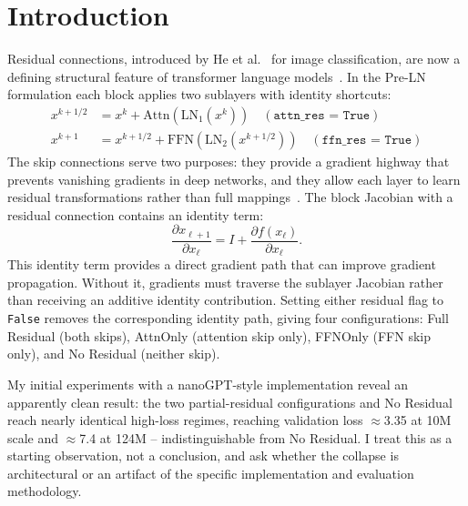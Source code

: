 \documentclass[11pt]{article}
\begin{document}
\section{Introduction}
Residual connections, introduced by He et al.~\cite{he2016deep} for image classification, are now a defining structural feature of transformer language models~\cite{vaswani2017attention,radford2019language}. In the Pre-LN formulation each block applies two sublayers with identity shortcuts:
\begin{align}
 x^{k+1/2} &= x^k + \mathrm{Attn}(\mathrm{LN}_1(x^k)) \quad (\texttt{attn\_res = True}) \label{eq:attn} \\
 x^{k+1}   &= x^{k+1/2} + \mathrm{FFN}(\mathrm{LN}_2(x^{k+1/2})) \quad (\texttt{ffn\_res = True}) \label{eq:ffn}
\end{align}
The skip connections serve two purposes: they provide a gradient highway that prevents vanishing gradients in deep networks, and they allow each layer to learn residual transformations rather than full mappings~\cite{he2016deep}. The block Jacobian with a residual connection contains an identity term:
\begin{equation}
\frac{\partial x_{\ell+1}}{\partial x_\ell} = I + \frac{\partial f(x_\ell)}{\partial x_\ell}.
\end{equation}
This identity term provides a direct gradient path that can improve gradient propagation. Without it, gradients must traverse the sublayer Jacobian rather than receiving an additive identity contribution. Setting either residual flag to \texttt{False} removes the corresponding identity path, giving four configurations: Full Residual (both skips), AttnOnly (attention skip only), FFNOnly (FFN skip only), and No Residual (neither skip).

My initial experiments with a nanoGPT-style implementation reveal an apparently clean result: the two partial-residual configurations and No Residual reach nearly identical high-loss regimes, reaching validation loss $\approx$3.35 at 10M scale and $\approx$7.4 at 124M -- indistinguishable from No Residual. I treat this as a starting observation, not a conclusion, and ask whether the collapse is architectural or an artifact of the specific implementation and evaluation methodology.
\end{document}
